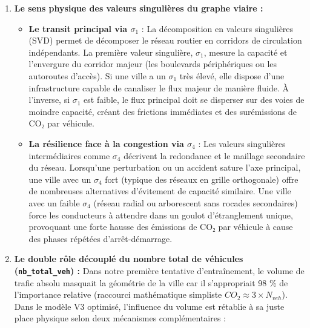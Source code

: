 \documentclass[10pt, a4paper]{article}
\providecommand{\tightlist}{}
\begin{document}
\begin{enumerate}
\def\labelenumi{\arabic{enumi}.}
\item
  \textbf{Le sens physique des valeurs singulières du graphe viaire :}

  \begin{itemize}
  \tightlist
  \item
    \textbf{Le transit principal via \(\sigma_1\)} : La décomposition en
    valeurs singulières (SVD) permet de décomposer le réseau routier en
    corridors de circulation indépendants. La première valeur
    singulière, \(\sigma_1\), mesure la capacité et l'envergure du
    corridor majeur (les boulevards périphériques ou les autoroutes
    d'accès). Si une ville a un \(\sigma_1\) très élevé, elle dispose
    d'une infrastructure capable de canaliser le flux majeur de manière
    fluide. À l'inverse, si \(\sigma_1\) est faible, le flux principal
    doit se disperser sur des voies de moindre capacité, créant des
    frictions immédiates et des surémissions de CO₂ par véhicule.
  \item
    \textbf{La résilience face à la congestion via \(\sigma_4\)} : Les
    valeurs singulières intermédiaires comme \(\sigma_4\) décrivent la
    redondance et le maillage secondaire du réseau. Lorsqu'une
    perturbation ou un accident sature l'axe principal, une ville avec
    un \(\sigma_4\) fort (typique des réseaux en grille orthogonale)
    offre de nombreuses alternatives d'évitement de capacité similaire.
    Une ville avec un faible \(\sigma_4\) (réseau radial ou arborescent
    sans rocades secondaires) force les conducteurs à attendre dans un
    goulot d'étranglement unique, provoquant une forte hausse des
    émissions de CO₂ par véhicule à cause des phases répétées
    d'arrêt-démarrage.
  \end{itemize}
\item
  \textbf{Le double rôle découplé du nombre total de véhicules
  (\texttt{nb\_total\_veh}) :} Dans notre première tentative
  d'entraînement, le volume de trafic absolu masquait la géométrie de la
  ville car il s'appropriait 98 \% de l'importance relative (raccourci
  mathématique simpliste \(CO_2 \approx 3 \times N_{veh}\)). Dans le
  modèle V3 optimisé, l'influence du volume est rétablie à sa juste
  place physique selon deux mécanismes complémentaires :


\end{enumerate}
\end{document}
